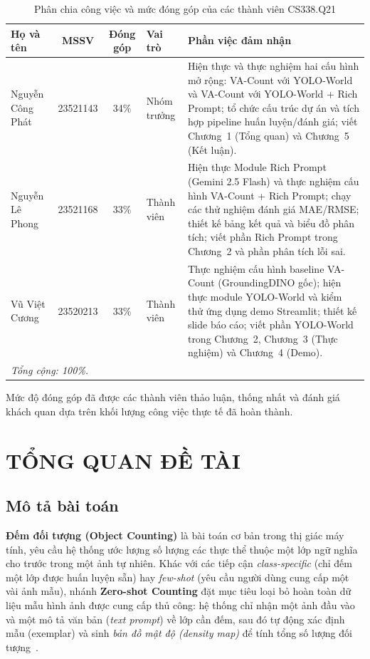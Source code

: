 \documentclass[a4paper,12pt]{report}
\numberwithin{figure}{chapter}
\numberwithin{table}{chapter}
\begin{document}
\begin{table}[H]
\centering
\renewcommand{\arraystretch}{1.25}
\begin{tabular}{|l|c|c|l|p{6cm}|}
\hline
\textbf{Họ và tên} & \textbf{MSSV} & \textbf{Đóng góp} & \textbf{Vai trò} & \textbf{Phần việc đảm nhận} \\
\hline
Nguyễn Công Phát & 23521143 & 34\% & Nhóm trưởng &
Hiện thực và thực nghiệm hai cấu hình mở rộng: VA-Count với YOLO-World và VA-Count với YOLO-World + Rich Prompt; tổ chức cấu trúc dự án và tích hợp pipeline huấn luyện/đánh giá; viết Chương~1 (Tổng quan) và Chương~5 (Kết luận). \\
\hline
Nguyễn Lê Phong & 23521168 & 33\% & Thành viên &
Hiện thực Module Rich Prompt (Gemini 2.5 Flash) và thực nghiệm cấu hình VA-Count + Rich Prompt; chạy các thử nghiệm đánh giá MAE/RMSE; thiết kế bảng kết quả và biểu đồ phân tích; viết phần Rich Prompt trong Chương~2 và phần phân tích lỗi sai. \\
\hline
Vũ Việt Cương & 23520213 & 33\% & Thành viên &
Thực nghiệm cấu hình baseline VA-Count (GroundingDINO gốc); hiện thực module YOLO-World và kiểm thử ứng dụng demo Streamlit; thiết kế slide báo cáo; viết phần YOLO-World trong Chương~2, Chương~3 (Thực nghiệm) và Chương~4 (Demo). \\
\hline
\multicolumn{5}{|l|}{\textit{Tổng cộng: 100\%.}} \\
\hline
\end{tabular}
\caption{Phân chia công việc và mức đóng góp của các thành viên CS338.Q21}
\label{tab:phan_cong}
\end{table}

Mức độ đóng góp đã được các thành viên thảo luận, thống nhất và đánh giá khách quan dựa trên khối lượng công việc thực tế đã hoàn thành.

\chapter{TỔNG QUAN ĐỀ TÀI}
\label{ch:overview}

\section{Mô tả bài toán}
\textbf{Đếm đối tượng (Object Counting)} là bài toán cơ bản trong thị giác máy tính, yêu cầu hệ thống ước lượng số lượng các thực thể thuộc một lớp ngữ nghĩa cho trước trong một ảnh tự nhiên. Khác với các tiếp cận \textit{class-specific} (chỉ đếm một lớp được huấn luyện sẵn) hay \textit{few-shot} (yêu cầu người dùng cung cấp một vài ảnh mẫu), nhánh \textbf{Zero-shot Counting} đặt mục tiêu loại bỏ hoàn toàn dữ liệu mẫu hình ảnh được cung cấp thủ công: hệ thống chỉ nhận một ảnh đầu vào và một mô tả văn bản (\textit{text prompt}) về lớp cần đếm, sau đó tự động xác định mẫu (exemplar) và sinh \textit{bản đồ mật độ (density map)} để tính tổng số lượng đối tượng~\cite{vacount, richprompts}.
\end{document}
